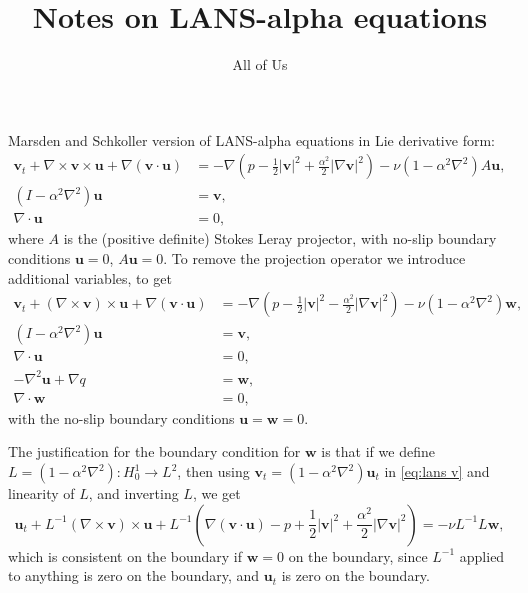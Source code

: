 \documentclass{article}
\def\MM#1{\boldsymbol{#1}}
\def\MM#1{\boldsymbol{#1}}
\begin{document}
\title{Notes on LANS-alpha equations}
\author{All of Us}
\maketitle

Marsden and Schkoller version of LANS-alpha equations in Lie
derivative form:
\begin{align}
  \MM{v}_t + \nabla\times \MM{v}\times \MM{u} + \nabla(\MM{v}\cdot\MM{u})
  &= -\nabla \left(p - \frac{1}{2}|\MM{v}|^2 + \frac{\alpha^2}{2}|\nabla\MM{v}|^2\right) - \nu (1-\alpha^2\nabla^2)A\MM{u}, \\
  (I - \alpha^2\nabla^2)\MM{u} & = \MM{v}, \\
  \nabla\cdot\MM{u} & = 0,
\end{align}
where $A$ is the (positive definite) Stokes Leray projector, with
no-slip boundary conditions $\MM{u}=0$, $A\MM{u}=0$. To remove the
projection operator we introduce additional variables, to get
\begin{align}
  \label{eq:lans v}
  \MM{v}_t + (\nabla\times \MM{v})\times \MM{u} + \nabla(\MM{v}\cdot\MM{u})
  &= -\nabla \left(p - \frac{1}{2}|\MM{v}|^2 - \frac{\alpha^2}{2}|\nabla\MM{v}|^2\right) - \nu (1-\alpha^2\nabla^2)\MM{w}, \\
  (I - \alpha^2\nabla^2)\MM{u} & = \MM{v}, \\
  \nabla\cdot\MM{u} & = 0, \\
  -\nabla^2 \MM{u} + \nabla q & = \MM{w}, \\
  \nabla\cdot\MM{w} & = 0,
\end{align}
with the no-slip boundary conditions $\MM{u}=\MM{w}=0$.

The justification for the boundary condition for $\MM{w}$ is that if
we define $L = (1-\alpha^2\nabla^2):H^1_0\to L^2$, then using
$\MM{v}_t=(1-\alpha^2\nabla^2)\MM{u}_t$ in \eqref{eq:lans v} and
linearity of $L$, and inverting $L$, we get
\begin{equation}
  \MM{u}_t + L^{-1}(\nabla\times \MM{v})\times \MM{u} +
  L^{-1}\left(\nabla(\MM{v}\cdot\MM{u}) - p + \frac{1}{2}|\MM{v}|^2 + \frac{\alpha^2}{2}|\nabla\MM{v}|^2\right) = -\nu L^{-1}L\MM{w},
\end{equation}
which is consistent on the boundary if $\MM{w}=0$ on the boundary,
since $L^{-1}$ applied to anything is zero on the boundary, and
$\MM{u}_t$ is zero on the boundary.
\end{document}
